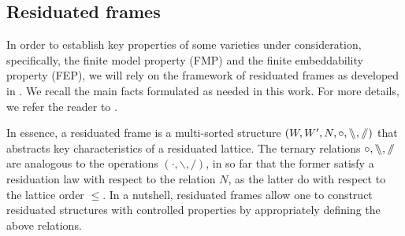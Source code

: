 \documentclass{amsart}
\theoremstyle{definition}
\numberwithin{equation}{section}
\newcommand{\leftr}{\bbslash}
\newcommand{\rightr}{\sslash}
\begin{document}
\subsection{Residuated frames}
In order to establish key properties of some varieties under consideration, specifically, the finite model property (FMP) and the finite embeddability property (FEP), we will rely on the framework of residuated frames as developed in \cite{GalatosJipsen2013}.  We recall the main facts formulated as needed in this work. For more details, we refer the reader to \cite{GalatosJipsen2013}.

In essence, a residuated frame is a multi-sorted structure $(W,W',N, \circ, \leftr, \rightr)$ that abstracts key characteristics of a residuated lattice.
The ternary relations $\circ, \leftr, \rightr$ are analogous to the operations $(\cdot, \backslash, /)$, in so far that the former satisfy a residuation law with respect to the relation $N$, as the latter do with respect to the lattice order $\leq$. In a nutshell, residuated frames allow one to construct residuated structures with controlled properties by appropriately defining the above relations.
\end{document}
